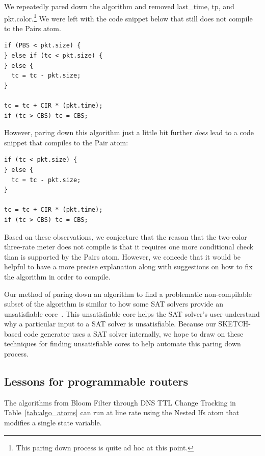 We repeatedly pared down the algorithm and removed last\_time, tp, and
pkt.color.\footnote{This paring down process is quite ad hoc at this point.} We
were left with the code snippet below that still does not compile to the Pairs
atom.

\begin{verbatim}
if (PBS < pkt.size) {
} else if (tc < pkt.size) {
} else {
  tc = tc - pkt.size;
}

tc = tc + CIR * (pkt.time);
if (tc > CBS) tc = CBS;
\end{verbatim}

However, paring down this algorithm just a little bit further {\em does} lead
to a code snippet that compiles to the Pair atom:

\begin{verbatim}
if (tc < pkt.size) {
} else {
  tc = tc - pkt.size;
}

tc = tc + CIR * (pkt.time);
if (tc > CBS) tc = CBS;
\end{verbatim}

Based on these observations, we conjecture that the reason that the two-color
three-rate meter does not compile is that it requires one more conditional
check than is supported by the Pairs atom. However, we concede that it would be
helpful to have a more precise explanation along with suggestions on how to fix
the algorithm in order to compile.

Our method of paring down an algorithm to find a problematic non-compilable
subset of the algorithm is similar to how some SAT solvers provide an
unsatisfiable core~\cite{unsat_core}. This unsatisfiable core helps the SAT
solver's user understand why a particular input to a SAT solver is
unsatisfiable. Because our SKETCH-based code generator uses a SAT solver
internally, we hope to draw on these techniques for finding unsatisfiable cores
to help automate this paring down process.

\subsection{Lessons for programmable routers}
\label{ss:lessons}

 The algorithms from Bloom Filter through DNS TTL Change Tracking
in Table~\ref{tab:algo_atoms} can run at line rate using the Nested Ifs atom that
modifies a single state variable.

